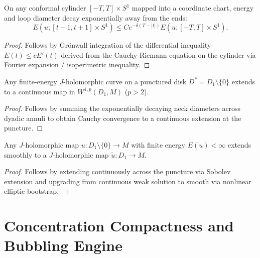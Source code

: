 \begin{theorem}
\label{a10:cylinder_decay}
\leanok
{}
On any conformal cylinder $[-T, T] \times S^1$ mapped into a coordinate chart, energy and loop diameter decay exponentially away from the ends:
\[
E(u; [t - 1, t + 1] \times S^1) \le C e^{-\delta(T - |t|)} E(u; [-T, T] \times S^1).
\]
\end{theorem}
\begin{proof}
Follows by Gr\"onwall integration of the differential inequality $E(t) \le c E'(t)$ derived from the Cauchy-Riemann equation on the cylinder via Fourier expansion / isoperimetric inequality.
\end{proof}

\begin{theorem}
\label{a11:puncture_extension}
\leanok
{}
Any finite-energy $J$-holomorphic curve on a punctured disk $D^* = D_1 \setminus \{0\}$ extends to a continuous map in $W^{1, p}(D_1, M)$ ($p > 2$).
\end{theorem}
\begin{proof}
Follows by summing the exponentially decaying neck diameters across dyadic annuli to obtain Cauchy convergence to a continuous extension at the puncture.
\end{proof}

\begin{theorem}
\label{a12:removal_of_singularities}
\leanok
{}
Any $J$-holomorphic map $u : D_1 \setminus \{0\} \to M$ with finite energy $E(u) < \infty$ extends smoothly to a $J$-holomorphic map $\tilde{u} : D_1 \to M$.
\end{theorem}
\begin{proof}
Follows by extending continuously across the puncture via Sobolev extension and upgrading from continuous weak solution to smooth via nonlinear elliptic bootstrap.
\end{proof}

\chapter{Concentration Compactness and Bubbling Engine}

